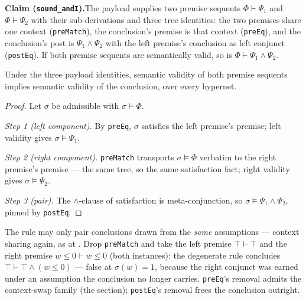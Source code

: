 

\textbf{Claim (\texttt{sound\_andI}).}\enspace The payload supplies two
premise sequents $\Phi \vdash \Psi_1$ and $\Phi \vdash \Psi_2$ with
their sub-derivations and three tree identities: the two premises share
one context (\texttt{preMatch}), the conclusion's premise is that
context (\texttt{preEq}), and the conclusion's post is
$\Psi_1 \wedge \Psi_2$ with the left premise's conclusion as left
conjunct (\texttt{postEq}). If both premise sequents are semantically
valid, so is $\Phi \vdash \Psi_1 \wedge \Psi_2$.

\begin{bthm}\label{thm:andi-sound}
Under the three payload identities, semantic validity of both premise
sequents implies semantic validity of the conclusion, over every
hypernet.
\end{bthm}
\begin{proof}
Let $\sigma$ be admissible with $\sigma \models \Phi$.

\emph{Step 1 (left component).} By \texttt{preEq}, $\sigma$ satisfies
the left premise's premise; left validity gives $\sigma \models \Psi_1$.

\emph{Step 2 (right component).} \texttt{preMatch} transports
$\sigma \models \Phi$ verbatim to the right premise's premise --- the
same tree, so the same satisfaction fact; right validity gives
$\sigma \models \Psi_2$.

\emph{Step 3 (pair).} The $\wedge$-clause of satisfaction is
meta-conjunction, so $\sigma \models \Psi_1 \wedge \Psi_2$, pinned by
\texttt{postEq}.
\end{proof}

\begin{bremark}\label{rem:andi-share}
The rule may only pair conclusions drawn from the \emph{same}
assumptions --- context sharing again, as at 
\cite{girard1987}. Drop \texttt{preMatch} and take the left premise
$\top \vdash \top$ and the right premise $w \leq 0 \vdash w \leq 0$
(both  instances): the degenerate rule concludes
$\top \vdash \top \wedge (w \leq 0)$ --- false at $\sigma(w) = 1$,
because the right conjunct was earned under an assumption the
conclusion no longer carries. \texttt{preEq}'s removal admits the
context-swap family (the  section); \texttt{postEq}'s
removal frees the conclusion outright.
\end{bremark}

